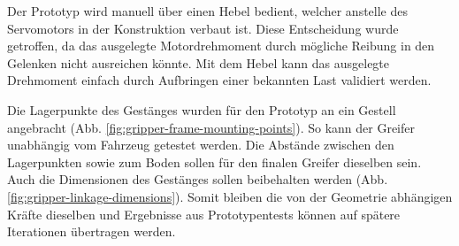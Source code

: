 Der Prototyp wird manuell über einen Hebel bedient, welcher anstelle des Servomotors in der Konstruktion verbaut ist. Diese Entscheidung wurde getroffen, da das ausgelegte Motordrehmoment durch mögliche Reibung in den Gelenken nicht ausreichen könnte. Mit dem Hebel kann das ausgelegte Drehmoment einfach durch Aufbringen einer bekannten Last validiert werden.

Die Lagerpunkte des Gestänges wurden für den Prototyp an ein Gestell angebracht (Abb. \ref{fig:gripper-frame-mounting-points}). So kann der Greifer unabhängig vom Fahrzeug getestet werden. Die Abstände zwischen den Lagerpunkten sowie zum Boden sollen für den finalen Greifer dieselben sein. Auch die Dimensionen des Gestänges sollen beibehalten werden (Abb. \ref{fig:gripper-linkage-dimensions}). Somit bleiben die von der Geometrie abhängigen Kräfte dieselben und Ergebnisse aus Prototypentests können auf spätere Iterationen übertragen werden. 

